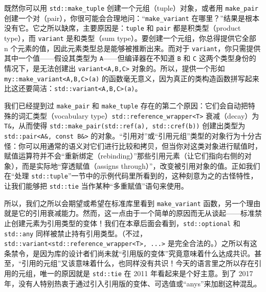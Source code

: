既然你可以用 \texttt{std::\allowbreak{}make\_\allowbreak{}tuple} 创建一个元组（tuple）对象，或者用 \texttt{make\_\allowbreak{}pair} 创建一个对（pair），你很可能会合理地问：“\texttt{make\_\allowbreak{}variant} 在哪里？”结果是根本没有它。它之所以缺席，主要原因是：\texttt{tuple} 和 \texttt{pair} 都是积类型（product type），而 \texttt{variant} 是和类型（sum type）。要创建一个元组，你总得提供它全部 n 个元素的值，因此元素类型总是能够被推断出来。而对于 \texttt{variant}，你只需提供其中一个值——假设其类型为 \texttt{A}——但编译器在不知道 \texttt{B} 和 \texttt{C} 这两个类型身份的情况下，是无法创建出 \texttt{variant<\allowbreak{}A,\allowbreak{}B,\allowbreak{}C>\allowbreak{}} 对象的。所以，提供一个形如 \texttt{my::\allowbreak{}make\_\allowbreak{}variant<\allowbreak{}A,\allowbreak{}B,\allowbreak{}C>\allowbreak{}(\allowbreak{}a)\allowbreak{}} 的函数毫无意义，因为真正的类构造函数拼写起来比这还要简洁：\texttt{std::\allowbreak{}variant<\allowbreak{}A,\allowbreak{}B,\allowbreak{}C>\allowbreak{}(\allowbreak{}a)\allowbreak{}}。

我们已经提到过 \texttt{make\_\allowbreak{}pair} 和 \texttt{make\_\allowbreak{}tuple} 存在的第二个原因：它们会自动把特殊的词汇类型（vocabulary type）\texttt{std::\allowbreak{}reference\_\allowbreak{}wrapper<\allowbreak{}T>\allowbreak{}} 衰减（decay）为 \texttt{T\&}，从而使得 \texttt{std::\allowbreak{}make\_\allowbreak{}pair(\allowbreak{}std::\allowbreak{}ref(\allowbreak{}a)\allowbreak{},\allowbreak{} std::\allowbreak{}cref(\allowbreak{}b)\allowbreak{})\allowbreak{}} 创建出类型为 \texttt{std::\allowbreak{}pair<\allowbreak{}A\&,\allowbreak{} const B\&>} 的对象。“引用对”或“引用元组”类型的对象行为十分古怪：你可以用通常的语义对它们进行比较和拷贝，但当你对这类对象进行赋值时，赋值运算符并不会“重新绑定（rebinding）”那些引用元素（让它们指向右侧的对象），而是实际地“穿透赋值（assigns through）”，改变被引用对象的值。正如我们在“处理 \texttt{std::\allowbreak{}tuple}”一节中的示例代码里所看到的，这种刻意为之的古怪特性，让我们能够把 \texttt{std::\allowbreak{}tie} 当作某种“多重赋值”语句来使用。

所以，我们之所以会期望或希望在标准库里看到 \texttt{make\_\allowbreak{}variant} 函数，另一个理由就是它的引用衰减能力。然而，这一点由于一个简单的原因而无从谈起——标准禁止创建元素为引用类型的变体！我们在本章后面会看到，\texttt{std::\allowbreak{}optional} 和 \texttt{std::\allowbreak{}any} 同样被禁止持有引用类型。（不过，\texttt{std::\allowbreak{}variant<\allowbreak{}std::\allowbreak{}reference\_\allowbreak{}wrapper<\allowbreak{}T>\allowbreak{},\allowbreak{} ...>} 是完全合法的。）之所以有这条禁令，是因为库的设计者们尚未就“引用版的变体”究竟意味着什么达成共识。甚至，“引用的元组”又该意味着什么，也同样没有共识！今天的语言里之所以存在引用的元组，唯一的原因就是 \texttt{std::\allowbreak{}tie} 在 2011 年看起来是个好主意。到了 2017 年，没有人特别热衷于通过引入引用版的变体、可选值或“anys”来加剧这种混乱。

